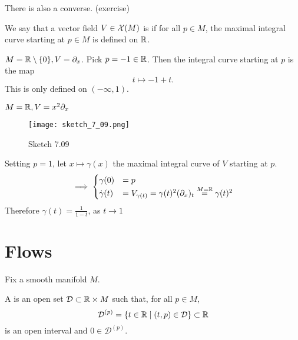 \begin{remark}
    There is also a converse. (exercise)
\end{remark}

\begin{definition*}
    We say that a vector field \(V\in \mathcal{X}(M)\) is  if for all 
    \(p\in M\), the maximal integral curve starting at \(p\in M\) is defined on \(\mathbb{R}\).
\end{definition*}

\begin{example}
    \(M=\mathbb{R}\setminus\{0\},V=\partial_x\). Pick \(p=-1\in \mathbb{R}\). Then the integral curve starting at 
    \(p\) is the map
    \[t\mapsto -1 +t.\]
    This is only defined on \((-\infty,1)\).
\end{example}

\begin{example}
    \(M=\mathbb{R},V=x^2\partial_x\)
    \begin{figure}[H]\label{fig:7.09}
        \centering
        \texttt{[image: sketch\_7\_09.png]}
        \caption{Sketch 7.09}
    \end{figure}
    Setting \(p=1\), let \(x\mapsto \gamma(x)\) the maximal integral curve of \(V\) starting at \(p\).
    \[\implies \begin{cases}
        \gamma(0)&=p\\
        \dot{\gamma}(t)&=V_{\gamma(t)}=\gamma(t)^2(\partial_x)_{t}\stackrel{M=\mathbb{R}}{=}\gamma(t)^2
    \end{cases}\]
    Therefore \(\gamma(t)=\frac{1}{1-t}\), as \(t\to 1\)
\end{example}

\section{Flows}

Fix a smooth manifold \(M\).

\begin{definition*}
    A  is an open set \(\mathcal{D}\subset\mathbb{R}\times M\) such that,
    for all \(p\in M\),
    \[\mathcal{D}^{(p)}=\{t\in \mathbb{R}\mid (t,p)\in \mathcal{D}\}\subset\mathbb{R}\]
    is an open interval and \(0\in \mathcal{D}^{(p)}\).
\end{definition*}

